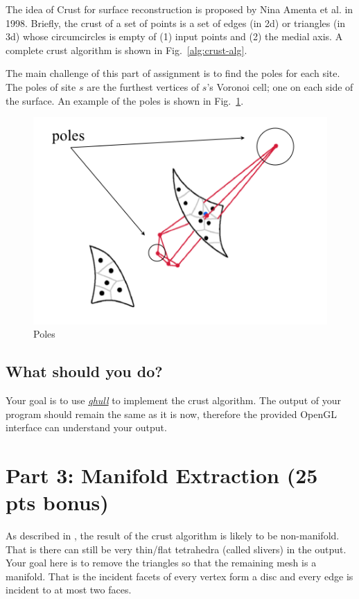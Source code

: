 \documentclass[11pt]{article}
\begin{document}
The idea of Crust for surface reconstruction is proposed by Nina Amenta et al. \cite{abk-anvra-98} in 1998.
Briefly, the crust of a set of points is a set of edges (in 2d) or triangles (in 3d) whose circumcircles is empty of
(1) input points and (2) the medial axis.  A complete crust algorithm is shown in Fig.~\ref{alg:crust-alg}.


The main challenge of this part of assignment is to find the poles for each site. The poles
of site $s$ are the furthest vertices of $s$'s Voronoi cell; one on each side of the surface. 
An example of the poles is shown in Fig.~\ref{fig:crust-pole}.


\begin{figure}[ht]
\centering
\begin{minipage}[t]{0.5\linewidth}
\includegraphics[width=\textwidth]{FIGS/crust-pole}
\caption{Poles}
\label{fig:crust-pole}
\end{minipage}
\end{figure}


\subsection{What should  you do?}

Your goal is to use \href{http://www.qhull.org/}{\it qhull} to implement the crust algorithm.
The output of your program should remain the same as it is now, therefore
the provided OpenGL interface can understand your output.



\section{Part 3: Manifold Extraction (25 pts bonus)}

As described in \cite{abk-anvra-98}, the result of the crust algorithm is likely to be non-manifold. That is
there can still be very thin/flat tetrahedra  (called slivers) in the output. Your goal here is to remove the triangles
so that the remaining mesh is a manifold. That is the incident facets of every vertex form a disc and
every edge is incident to at most two faces. 



\end{document}

